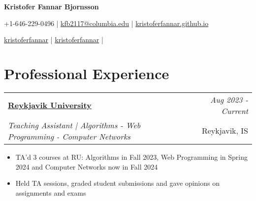 \documentclass{article}
\makeatletter
\newcommand{\resumeSubheading}[4]{
\vspace{0.5mm}
    \begin{tabular*}{0.98\textwidth}[t]{l@{\extracolsep{\fill}}r}
        \textbf{#1} & \textit{\footnotesize{#4}} \\
        \textit{\footnotesize{#3}} &  \footnotesize{#2}\\
    \end{tabular*}
    \vspace{-2.4mm}
}
\newcommand{\resumeSubHeadingListStart}{}
\newcommand{\resumeItemListStart}{\begin{itemize}[leftmargin=*,labelsep=1mm,itemsep=0.5mm]}
\newcommand{\resumeItemListEnd}{\end{itemize}\vspace{-2mm}}
\newcommand{\socialicon}[1]{\raisebox{-0.05em}{\resizebox{!}{1em}{#1}}}
\newcommand{\headerfontiii}{\fontfamily{ppl}\selectfont} %
\makeatother
\begin{document}
\headerfontiii

\begin{center}
    {\Huge\textbf{Kristofer Fannar Bjornsson}}
\end{center}
\vspace{-6mm}

\begin{center}
    \small{
    +1-646-229-0496 | \href{mailto:kfb2117@columbia.edu}{kfb2117@columbia.edu} | 
    \href{https://kristoferfannar.github.io}{kristoferfannar.github.io}
    }
\end{center}
\vspace{-6mm}

\begin{center}
    \small{
    \socialicon{\faLinkedin} \href{https://www.linkedin.com/in/kristoferfannar/}{kristoferfannar} | 
    \socialicon{\faGithub} \href{https://github.com/kristoferfannar}{kristoferfannar} | 
    }
\end{center}
\vspace{-6mm}
%
%



\section{\textbf{Professional Experience}}
\vspace{-0.4mm}
  \resumeSubHeadingListStart

  \resumeSubheading
  {\href{https://www.ru.is}{Reykjavik University}}{Reykjavik, IS}
    {Teaching Assistant | Algorithms - Web Programming - Computer Networks}{Aug 2023 - Current}
    \resumeItemListStart
      \item TA'd 3 courses at RU: Algorithms in Fall 2023, Web Programming in Spring 2024 and Computer Networks now in Fall 2024
	  \item Held TA sessions, graded student submissions and gave opinions on assignments and exams
    \resumeItemListEnd
\end{document}
